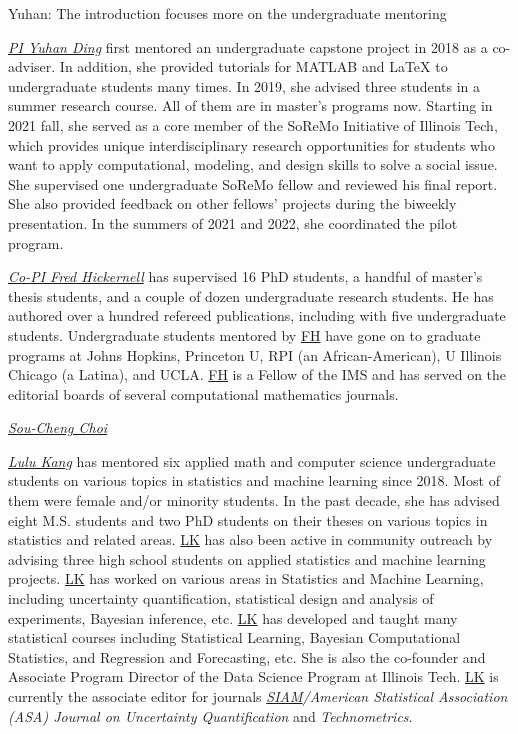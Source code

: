 \documentclass[11pt]{NSFamsart}
\newcommand{\FH}{\hyperlink{FHlink}{FH}\xspace}
\newcommand{\LK}{\hyperlink{LKlink}{LK}\xspace}
\newcommand{\SIAM}{\hyperlink{SIAMlink}{SIAM}\xspace}
\newcommand{\YDNote}[1]{{\color{magenta}Yuhan: #1}}
\begin{document}
\YDNote{The introduction focuses more on the undergraduate mentoring}

\noindent \underline{\textit{PI Yuhan Ding}} first mentored an undergraduate capstone project in 2018 as a co-adviser. In addition, she provided tutorials for MATLAB and LaTeX to undergraduate students many times. In 2019, she advised three students in a summer research course. All of them are in master’s programs now. Starting in 2021 fall, she served as a core member of the SoReMo Initiative of Illinois Tech, which provides unique interdisciplinary research opportunities for students who want to apply computational, modeling, and design skills to solve a social issue. She supervised one undergraduate SoReMo fellow and reviewed his final report. She also provided feedback on other fellows’ projects during the biweekly presentation. In the summers of 2021 and 2022, she coordinated the pilot program.

\noindent \underline{\textit{Co-PI Fred Hickernell}} has supervised 16 PhD students, a handful of master's thesis students, and a couple of dozen undergraduate research students.  He has authored over a hundred refereed publications, including \cite{ChoEtal22a,HicEtal14b,LiHic03a,SonRidFasHic10a} with five undergraduate students.  Undergraduate students mentored by \FH have gone on to graduate programs at Johns Hopkins, Princeton U, RPI (an African-American), U Illinois Chicago (a Latina), and UCLA. \FH is a Fellow of the IMS and has served on the editorial boards of several computational mathematics journals. 

\noindent\underline{\textit{Sou-Cheng Choi}} 

\noindent \underline{\textit{Lulu Kang}} has mentored six applied math and computer science undergraduate students on various topics in statistics and machine learning since 2018. Most of them were female and/or minority students. In the past decade, she has advised eight M.S. students and two PhD students on their theses on various topics in statistics and related areas. \LK has also been active in community outreach by advising three high school students on applied statistics and machine learning projects. 
\LK has worked on various areas in Statistics and Machine Learning, including uncertainty quantification, statistical design and analysis of experiments, Bayesian inference, etc. 
\LK has developed and taught many statistical courses including Statistical Learning, Bayesian Computational Statistics, and Regression and Forecasting, etc. She is also the co-founder and Associate Program Director of the Data Science Program at Illinois Tech. \LK is currently the associate editor for journals \emph{\SIAM/American Statistical Association (ASA) Journal on Uncertainty Quantification} and \emph{Technometrics}.
\end{document}

